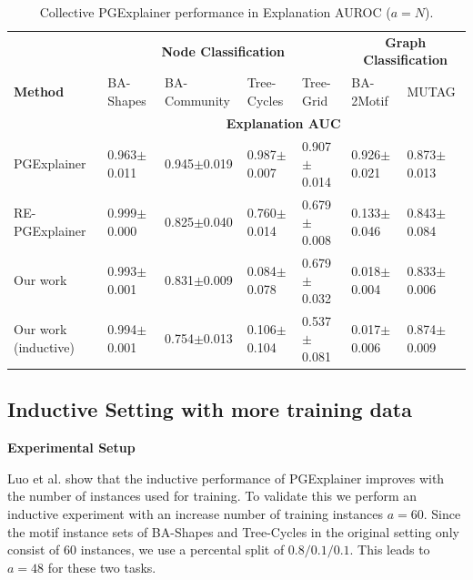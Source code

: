 \begin{table}[ht]
    \centering
    \scriptsize
    \begin{tabularx}{\textwidth}{l|XXXX|XX}   %
    \textbf{} & \multicolumn{4}{c}{\textbf{Node Classification}} & \multicolumn{2}{c}{\textbf{Graph Classification}} \\
    \textbf{Method} & BA-Shapes & BA-Community & Tree-Cycles & Tree-Grid & BA-2Motif & MUTAG \\
    \midrule
    \addlinespace
    \textbf{} & \multicolumn{6}{c}{\textbf{Explanation AUC}} \\
    \midrule
    PGExplainer & 0.963$\pm$0.011 & 0.945$\pm$0.019 & 0.987$\pm$0.007 & 0.907$\pm$0.014 & 0.926$\pm$0.021 & 0.873$\pm$0.013 \\
    \midrule
    RE-PGExplainer & 0.999$\pm$0.000 & 0.825$\pm$0.040 & 0.760$\pm$0.014 & 0.679$\pm$0.008 & 0.133$\pm$0.046 & 0.843$\pm$0.084 \\
    \midrule
    Our work & 0.993$\pm$0.001 & 0.831$\pm$0.009 & 0.084$\pm$0.078 & 0.679$\pm$0.032 & 0.018$\pm$0.004 & 0.833$\pm$0.006 \\
    \midrule
    \midrule
    Our work (inductive) & 0.994$\pm$0.001 & 0.754$\pm$0.013 & 0.106$\pm$0.104 & 0.537$\pm$0.081 & 0.017$\pm$0.006 & 0.874$\pm$0.009 \\
    \bottomrule
    \end{tabularx}
    \caption[Collective performance of our reimplementation]{Collective PGExplainer performance in Explanation AUROC ($a=N$).}
    \label{tab:pgexplainer_auc}
\end{table}


\subsection{Inductive Setting with more training data}

\textbf{Experimental Setup}\par
Luo et al. \cite{} show that the inductive performance of PGExplainer improves with the number of instances used for training. To validate this we perform an inductive experiment with an increase number of training instances $a=60$. Since the motif instance sets of BA-Shapes and Tree-Cycles in the original setting only consist of 60 instances, we use a percental split of $0.8/0.1/0.1$. This leads to $a=48$ for these two tasks. \bigskip

